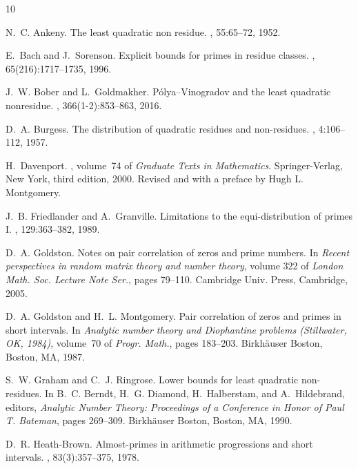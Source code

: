 \documentclass[pdflatex]{sn-jnl}%
\theoremstyle{sltheorems}
\theoremstyle{plainrem}
\theoremstyle{definition}
\begin{document}
\begin{thebibliography}{10}

N.~C. Ankeny.
\newblock The least quadratic non residue.
, 55:65--72, 1952.

E.~Bach and J.~Sorenson.
\newblock Explicit bounds for primes in residue classes.
, 65(216):1717--1735, 1996.

J.~W. Bober and L.~Goldmakher.
\newblock P\'olya--{V}inogradov and the least quadratic nonresidue.
, 366(1-2):853--863, 2016.

D.~A. Burgess.
\newblock The distribution of quadratic residues and non-residues.
, 4:106--112, 1957.

H.~Davenport.
, volume~74 of {\em Graduate
  Texts in Mathematics}.
\newblock Springer-Verlag, New York, third edition, 2000.
\newblock Revised and with a preface by Hugh L. Montgomery.

J.~B. Friedlander and A.~Granville.
\newblock Limitations to the equi-distribution of primes {I}.
, 129:363--382, 1989.

D.~A. Goldston.
\newblock Notes on pair correlation of zeros and prime numbers.
\newblock In {\em Recent perspectives in random matrix theory and number
  theory}, volume 322 of {\em London Math. Soc. Lecture Note Ser.}, pages
  79--110. Cambridge Univ. Press, Cambridge, 2005.

D.~A. Goldston and H.~L. Montgomery.
\newblock Pair correlation of zeros and primes in short intervals.
\newblock In {\em Analytic number theory and {D}iophantine problems
  ({S}tillwater, {OK}, 1984)}, volume~70 of {\em Progr. Math.}, pages 183--203.
  Birkh\"auser Boston, Boston, MA, 1987.

S.~W. Graham and C.~J. Ringrose.
\newblock Lower bounds for least quadratic non-residues.
\newblock In B.~C. Berndt, H.~G. Diamond, H.~Halberstam, and A.~Hildebrand,
  editors, {\em Analytic Number Theory: Proceedings of a Conference in Honor of
  Paul T. Bateman}, pages 269--309. Birkh{\"a}user Boston, Boston, MA, 1990.

D.~R. Heath-Brown.
\newblock Almost-primes in arithmetic progressions and short intervals.
, 83(3):357--375, 1978.


\end{thebibliography}
\end{document}
